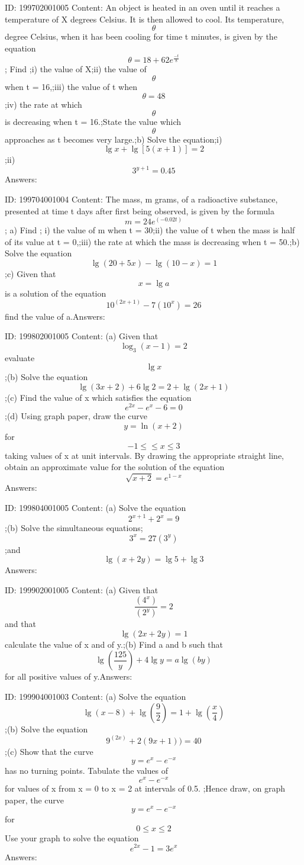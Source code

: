 \documentclass{article}
\begin{document}
ID: 199702001005
Content:
An object is heated in an oven until it reaches a temperature of X degrees Celsius. It is then allowed to cool. Its temperature, \[\theta\] degree Celsius, when it has been cooling for time t minutes, is given by the equation \[\theta = 18+62e^\frac{-t}{8}\]; Find ;i) the value of X;ii) the value of \[\theta\] when t = 16,;iii) the value of t when \[\theta=48\];iv) the rate at which \[\theta\]  is decreasing when t = 16.;State the value which \[\theta\] approaches as t becomes very large.;b) Solve the equation;i) \[\lg x+\lg[5(x+1)]=2\];ii) \[3^{y+1}=0.45\]Answers:

ID: 199704001004
Content:
The mass, m grams, of a radioactive substance, presented at time t days after first being observed, is given by the formula \[m=24e^{(-0.02t)}\]; a) Find ; i) the value of m when t = 30;ii) the value of t when the mass is half of its value at t = 0,;iii) the rate at which the mass is decreasing when t = 50.;b) Solve the equation \[\lg(20+5x)-\lg(10-x)=1\];c) Given that \[x=\lg a\] is a solution of the equation \[10^{(2x+1)}-7(10^x)=26\] find the value of a.Answers:

ID: 199802001005
Content:
(a) Given that \[\log_3(x-1)=2\] evaluate \[\lg x\];(b) Solve the equation \[\lg (3x + 2) + 6 \lg 2 = 2 + \lg (2x + 1)\];(c)	Find the value of x which satisfies the equation \[e^{2x}-e^x-6=0\];(d) Using graph paper, draw the curve \[y = \ln (x + 2) \]for \[-1\leq \leq x\leq 3\] taking values of x at unit intervals. By drawing the appropriate straight line, obtain an approximate value for the solution of the equation \[\sqrt{x+2}=e^{1-x}\]Answers:

ID: 199804001005
Content:
(a) Solve the equation \[2^{x+1}+2^x=9\] ;(b) Solve the simultaneous equations;\[3^x=27(3^y)\];and \[\lg(x+2y)=\lg5+\lg3\]Answers:

ID: 199902001005
Content:
(a) Given that \[\frac{(4^x)}{(2^y)}=2\] and that \[\lg (2x + 2y) = 1\] calculate the value of x and of y.;(b)	Find a and b such that \[\lg(\frac{125}{y})+4\lg y=a\lg(by)\]  for all positive values of y.Answers:

ID: 199904001003
Content:
(a)	Solve the equation \[\lg(x-8)+\lg(\frac{9}{2})=1+\lg(\frac{x}{4})\];(b)	Solve the equation \[9^{(2x)}+2(9{x+1}))=40\];(c)	Show that the curve \[y=e^x-e^{-x}\] has no turning points. Tabulate the values of \[e^x-e^{-x}\] for values of x from x = 0 to x = 2 at intervals of 0.5. ;Hence draw, on graph paper, the curve \[y=e^x-e^{-x}\] for \[0\leq x\leq 2\] Use your graph to solve the equation \[e^{2x}-1=3e^x\]Answers:
\end{document}
